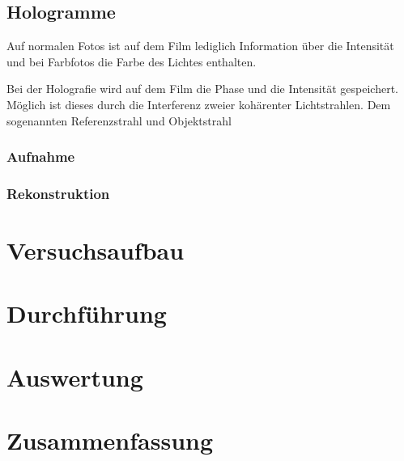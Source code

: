 \documentclass[12pt]{article}
\begin{document}
\subsection{Hologramme}
Auf normalen Fotos ist auf dem Film lediglich Information über die Intensität und bei Farbfotos die Farbe des Lichtes enthalten.

Bei der Holografie wird auf dem Film die Phase und die Intensität gespeichert. Möglich ist dieses durch die Interferenz zweier kohärenter Lichtstrahlen.
Dem sogenannten Referenzstrahl und Objektstrahl
\subsubsection{Aufnahme}
\subsubsection{Rekonstruktion}

\section{Versuchsaufbau}

\section{Durchführung}
\section{Auswertung}
\section{Zusammenfassung}
\end{document}
